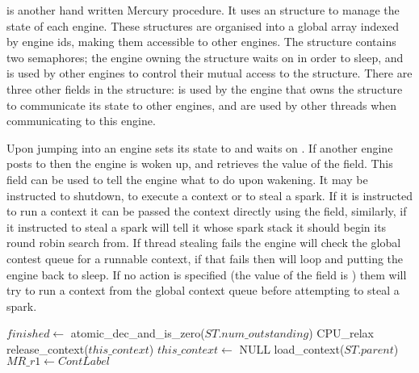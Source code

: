 \sleep is another hand written Mercury procedure.
It uses an
\enginesleepsync structure to manage the state of each engine.
These structures are organised into a global array indexed by engine ids,
making them accessible to other engines.
The structure contains two semaphores;
the engine owning the structure waits on  in order to
sleep,
and  is used by other engines to control their mutual
access to the \enginesleepsync structure.
There are three other fields in the structure:
 is used by the engine that owns the structure to communicate
its state to other engines,
 and  are used by other threads when
communicating to this engine.

Upon jumping into \idle an engine sets its state to  and
waits on .
If another engine posts to  then the engine is woken up,
and retrieves the value of the  field.
This field can be used to tell the engine what to do upon wakening.
It may be instructed to shutdown, to execute a context or to steal a spark.
If it is instructed to run a context it can be passed the context directly
using the  field,
similarly, if it instructed to steal a spark  will tell
it whose spark stack it should begin its round robin search from.
If thread stealing fails the engine will check the global contest queue for
a runnable context,
if that fails then \idle will loop and putting the engine back to sleep.
If no action is specified
(the value of the  field is )
them \sleep will try to run a context from the global context queue before
attempting to steal a spark.


\begin{algorithm}
\begin{algorithmic}[1]
  \State $finished \gets$ atomic\_dec\_and\_is\_zero($ST.num\_outstanding$)
    \Else
        \State CPU\_relax
      \EndWhile
      \State release\_context($this\_context$)
      \State $this\_context \gets$ NULL
      \State load\_context($ST.parent$)
    \EndIf
  \Else
      \State $MR\_r1 \gets ContLabel$
    \Else
    \EndIf
  \EndIf
\EndProcedure
\end{algorithmic}
\caption{\joinandcontinue}
\label{alg:join_and_continue_ws2}
\end{algorithm}

